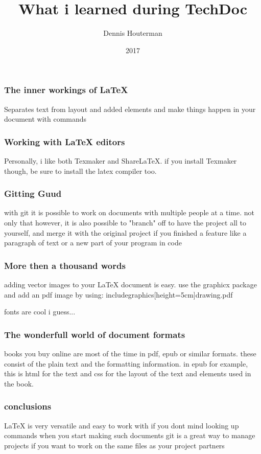 \documentclass{beamer}
\title{What i learned during TechDoc}
\author{Dennis Houterman}
\date{2017}
\begin{document}
 
\frame{\titlepage}
 
\begin{frame}
\frametitle{The inner workings of LaTeX}
Separates text from layout and added elements and make things happen in your document with commands
\end{frame}

\begin{frame}
\frametitle{Working with LaTeX editors}
Personally, i like both Texmaker and ShareLaTeX. if you install Texmaker though, be sure to install the latex compiler too.
\end{frame}

\begin{frame}
\frametitle{Gitting Guud}
with git it is possible to work on documents with multiple people at a time. not only that however, it is also possible to "branch" off to have the project all to yourself, and merge it with the original project if you finished a feature like a paragraph of text or a new part of your program in code 
\end{frame}

\begin{frame}
\frametitle{More then a thousand words}
adding vector images to your LaTeX document is easy. use the {graphicx} package and add an pdf image by using: includegraphics[height=5cm]{drawing.pdf}
\end{frame}
 
\begin{frame}
fonts are cool i guess...
\end{frame} 

\begin{frame}
\frametitle{The wonderfull world of document formats}
books you buy online are most of the time in pdf, epub or similar formats. these consist of the plain text and the formatting information. in epub for example, this is html for the text and css for the layout of the text and elements used in the book.
\end{frame} 

\begin{frame}
\frametitle{conclusions}
LaTeX is very versatile and easy to work with if you dont mind looking up commands when you start making such documents
git is a great way to manage projects if you want to work on the same files as your project partners
\end{frame}
 
\end{document}

